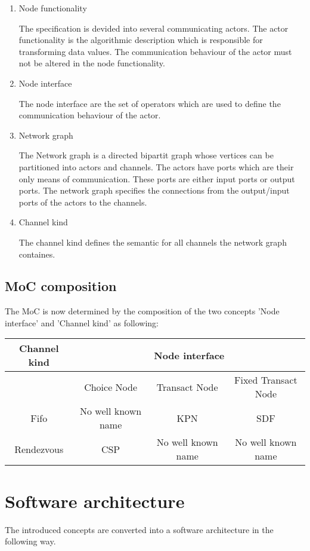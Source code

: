 \begin{enumerate}
\item Node functionality

The specification is devided into several communicating actors.
The actor functionality is the algorithmic description
which is responsible for transforming data values. The communication
behaviour of the actor must not be altered in the node functionality.

\item Node interface

The node interface are the set of operators which are used to
define the communication behaviour of the actor.

\item Network graph

The Network graph is a directed bipartit graph whose vertices
can be partitioned into actors and channels.
The actors have ports which are their only means of communication.
These ports are either input ports or output ports.
The network graph specifies the connections from
the output/input ports of the actors to the channels.

\item
Channel kind

The channel kind defines the semantic for all channels
the network graph containes.
\end{enumerate}

\subsection{MoC composition}

The MoC is now determined by the composition of the two concepts 'Node interface'
and 'Channel kind' as following:

\begin{tabular}{|c||c|c|c|}
\hline
 Channel kind & \multicolumn{3}{c|}{ Node interface } \\
\hline
              & Choice Node         & Transact Node      & Fixed Transact Node \\
\hline \hline
 Fifo         & No well known name  & KPN                & SDF \\
\hline
 Rendezvous   & CSP                 & No well known name & No well known name \\
\hline
\end{tabular}

\section{Software architecture}
The introduced concepts are converted into a software architecture in the following way.

